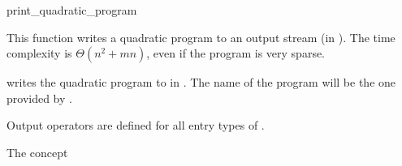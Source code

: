 \begin{ccRefFunction}{print_quadratic_program}


This function writes a quadratic program to an output stream (in 
). The time complexity is $\Theta (n^2 + mn)$, even 
if the program is very sparse.

{writes the quadratic program  to  in .
The name of the program will be the one provided by .}

Output operators are defined for all entry types of .

\ccExample
{}

\ccSeeAlso

The concept


\end{ccRefFunction}
